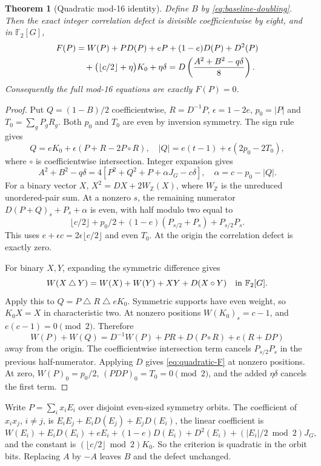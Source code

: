 \documentclass[11pt]{article}
\newtheorem{theorem}{Theorem}[section]
\theoremstyle{definition}
\theoremstyle{remark}
\begin{document}
\begin{theorem}[Quadratic mod-16 identity]\label{thm:mod16}
Define $B$ by \eqref{eq:baseline-doubling}. Then the exact integer
correlation defect is divisible coefficientwise by eight, and in
$\mathbb F_2[G]$,
\begin{align}\label{eq:quadratic-F}
 F(P)&=W(P)+P D(P)+eP+(1-e)D(P)+D^2(P)\notag\\
 &\quad+\bigl(\lfloor c/2\rfloor+\eta\bigr)K_0+\eta\delta
 =D\left(\frac{A^2+B^2-q\delta}{8}\right).
\end{align}
Consequently the full mod-16 equations are exactly $F(P)=0$.
\end{theorem}
\begin{proof}
Put $Q=(1-B)/2$ coefficientwise, $R=D^{-1}P$,
$\epsilon=1-2e$, $p_0=|P|$ and $T_0=\sum_gP_gR_g$.
Both $p_0$ and $T_0$ are even by inversion symmetry. The sign rule gives
\[
 Q=eK_0+\epsilon(P+R-2P\circ R),\quad
 |Q|=e(t-1)+\epsilon(2p_0-2T_0),
\]
where $\circ$ is coefficientwise intersection. Integer expansion gives
\[
 A^2+B^2-q\delta=4[P^2+Q^2+P+\alpha J_G-c\delta],\quad
 \alpha=c-p_0-|Q|.
\]
For a binary vector $X$, $X^2=DX+2W_{\mathbb Z}(X)$, where
$W_{\mathbb Z}$ is the unreduced unordered-pair sum. At a nonzero $s$,
the remaining numerator $D(P+Q)_s+P_s+\alpha$ is even, with half modulo
two equal to
\[
 \lfloor c/2\rfloor+p_0/2+(1-e)(P_{s/2}+P_s)+P_{s/2}P_s.
\]
This uses $e+\epsilon c=2\epsilon\lfloor c/2\rfloor$ and even $T_0$. At
the origin the correlation defect is exactly zero.

For binary $X,Y$, expanding the symmetric difference gives
\[
 W(X\mathbin\triangle Y)=W(X)+W(Y)+XY+D(X\circ Y)
 \quad\hbox{in }\mathbb F_2[G].
\]
Apply this to $Q=P\mathbin\triangle R\mathbin\triangle eK_0$.
Symmetric supports have even weight, so $K_0X=X$ in characteristic two.
At nonzero positions $W(K_0)_s=c-1$, and $e(c-1)=0\pmod2$. Therefore
\[
 W(P)+W(Q)=D^{-1}W(P)+PR+D(P\circ R)+e(R+DP)
\]
away from the origin. The coefficientwise intersection term cancels
$P_{s/2}P_s$ in the previous half-numerator. Applying $D$ gives
\eqref{eq:quadratic-F} at nonzero positions. At zero, $W(P)_0=p_0/2$,
$(PDP)_0=T_0=0\pmod2$, and the added $\eta\delta$ cancels the first
term.
\end{proof}

Write $P=\sum_i x_iE_i$ over disjoint even-sized symmetry orbits. The
coefficient of $x_ix_j$, $i\ne j$, is $E_iE_j+E_iD(E_j)+E_jD(E_i)$, the
linear coefficient is
\[
 W(E_i)+E_iD(E_i)+eE_i+(1-e)D(E_i)+D^2(E_i)
       +( |E_i|/2\bmod2)J_G,
\]
and the constant is $(\lfloor c/2\rfloor\bmod2)K_0$. So the criterion is
quadratic in the orbit bits. Replacing $A$ by $-A$ leaves $B$ and the
defect unchanged.
\end{document}
